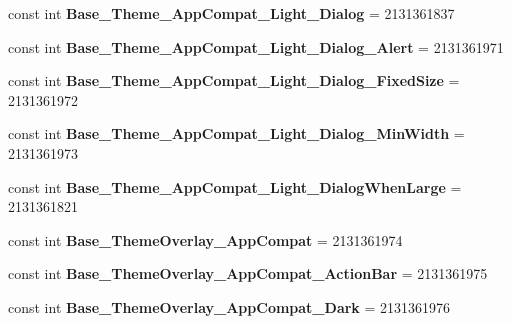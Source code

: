 \begin{DoxyCompactItemize}
const int {\bfseries Base\+\_\+\+Theme\+\_\+\+App\+Compat\+\_\+\+Light\+\_\+\+Dialog} = 2131361837
\item 
\mbox{\label{class_pinned_app_1_1_droid_1_1_resource_1_1_style_a1c392296045a0edd76d3be80f60c478a}} 
const int {\bfseries Base\+\_\+\+Theme\+\_\+\+App\+Compat\+\_\+\+Light\+\_\+\+Dialog\+\_\+\+Alert} = 2131361971
\item 
\mbox{\label{class_pinned_app_1_1_droid_1_1_resource_1_1_style_aa346b30c48be6fd3407ba53a4d8188c1}} 
const int {\bfseries Base\+\_\+\+Theme\+\_\+\+App\+Compat\+\_\+\+Light\+\_\+\+Dialog\+\_\+\+Fixed\+Size} = 2131361972
\item 
\mbox{\label{class_pinned_app_1_1_droid_1_1_resource_1_1_style_a16bf6cb7d7204d84dff4d9f3230d400f}} 
const int {\bfseries Base\+\_\+\+Theme\+\_\+\+App\+Compat\+\_\+\+Light\+\_\+\+Dialog\+\_\+\+Min\+Width} = 2131361973
\item 
\mbox{\label{class_pinned_app_1_1_droid_1_1_resource_1_1_style_ad0bb3c1424820b457647454a13711df0}} 
const int {\bfseries Base\+\_\+\+Theme\+\_\+\+App\+Compat\+\_\+\+Light\+\_\+\+Dialog\+When\+Large} = 2131361821
\item 
\mbox{\label{class_pinned_app_1_1_droid_1_1_resource_1_1_style_af4757758d3fc957f486255fa4547f1a4}} 
const int {\bfseries Base\+\_\+\+Theme\+Overlay\+\_\+\+App\+Compat} = 2131361974
\item 
\mbox{\label{class_pinned_app_1_1_droid_1_1_resource_1_1_style_a7041e167b61b44575fc7ab62e64eefc6}} 
const int {\bfseries Base\+\_\+\+Theme\+Overlay\+\_\+\+App\+Compat\+\_\+\+Action\+Bar} = 2131361975
\item 
\mbox{\label{class_pinned_app_1_1_droid_1_1_resource_1_1_style_ad0b21c3b6584b7759ab1f7cb925b9b4c}} 
const int {\bfseries Base\+\_\+\+Theme\+Overlay\+\_\+\+App\+Compat\+\_\+\+Dark} = 2131361976
\item 
\mbox{\label{class_pinned_app_1_1_droid_1_1_resource_1_1_style_a7ff7f525eccda63f66dbb1faccf108a5}} 

\end{DoxyCompactItemize}
